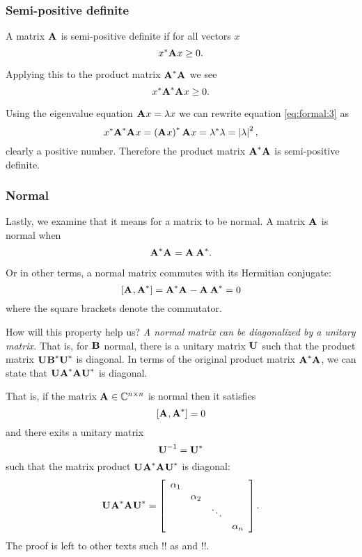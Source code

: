 
\subsubsection{Semi-positive definite}
A matrix $\A{}$ is semi-positive definite if for all vectors $x$
\begin{equation}
  x^{*}\A{}x  \geq  0.
\end{equation}

Applying this to the product matrix $\prdm{*}$ we see
\begin{equation}
  x^{*}\prdm{*}x  \geq  0.
  \label{eq:formal:3}
\end{equation}

Using the eigenvalue equation $\A{}x=\lambda x$ we can rewrite equation \eqref{eq:formal:3} as
\begin{equation}
  x^{*}\prdm{*}x  =  \paren{\A{}x}^{*}\A{}x  =  \lambda^{*}\lambda = \abs{\lambda}^{2},
\end{equation}
clearly a positive number. Therefore the product matrix $\prdm{*}$ is semi-positive definite.


\subsubsection{Normal}

Lastly, we examine that it means for a matrix to be normal. A matrix $\A{}$ is normal when
\begin{equation}
  \prdm{*}  =  \prdmm{*}.
\end{equation}

Or in other terms, a normal matrix commutes with its Hermitian conjugate: 
\begin{equation}
  \brac{ \A{}, \A{*} } = \prdm{*}-\prdmm{*} =  0
\end{equation}
where the square brackets denote the commutator.

How will this property help us? \textit{A normal matrix can be diagonalized by a unitary matrix.} That is, for $\B{}$ normal, there is a unitary matrix $\U{}$ such that the product matrix $\U{}\B{*}\U{*}$ is diagonal. In terms of the original product matrix $\prdm{*}$, we can state that $\U{}\prdm{*}\U{*}$ is diagonal. 

That is, if the matrix $\Ac{n}$ is normal then it satisfies
\begin{equation}
  \brac{ \A{}, \A{*} } = 0
\end{equation}
and there exits a unitary matrix
\begin{equation}
  \U{-1}  =  \U{*}
\end{equation}
such that the matrix product $\U{}\prdm{*}\U{*}$ is diagonal:
\begin{equation}
  \U{}\prdm{*}\U{*} = \mat{cccc}
  {
  \alpha_{1}\\
  &\alpha_{2}\\
  &&\ddots\\
  &&&\alpha_{n}\\
  }.
\end{equation}
The proof is left to other texts such !! as and !!.

